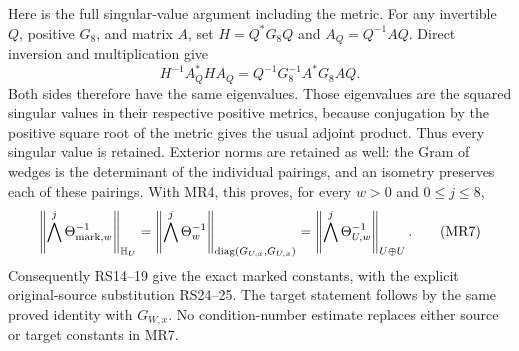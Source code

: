 \documentclass[11pt]{article}
\begin{document}
Here is the full singular-value argument including the metric.
For any invertible $Q$, positive $G_8$, and matrix $A$, set
$H=Q^*G_8Q$ and $A_Q=Q^{-1}AQ$. Direct inversion and
multiplication give
\begin{equation}
 H^{-1}A_Q^*HA_Q
       =Q^{-1}G_8^{-1}A^*G_8AQ.
 \tag{MR6}
\end{equation}
Both sides therefore have the same eigenvalues. Those eigenvalues
are the squared singular values in their respective positive
metrics, because conjugation by the positive square root of
the metric gives the usual adjoint product. Thus every singular
value is retained. Exterior norms are retained as well: the
Gram of wedges is the determinant of the individual pairings,
and an isometry preserves each of these pairings. With MR4,
this proves, for every $w>0$ and $0\le j\le8$,
\begin{equation}
 \left\|\bigwedge^j\Theta_{{\rm mark},w}^{-1}\right\|_{\mathbb H_U}
 =\left\|\bigwedge^j\Theta_w^{-1}\right\|_{
             \operatorname{diag}(G_{U,x},G_{U,x})}
 =\left\|\bigwedge^j\Theta_{U,w}^{-1}\right\|_{U\oplus U}.
 \tag{MR7}
\end{equation}
Consequently RS14--19 give the exact marked constants, with
the explicit original-source substitution RS24--25. The
target statement follows by the same proved identity with
$G_{W,x}$. No condition-number estimate replaces either
source or target constants in MR7.
\end{document}
